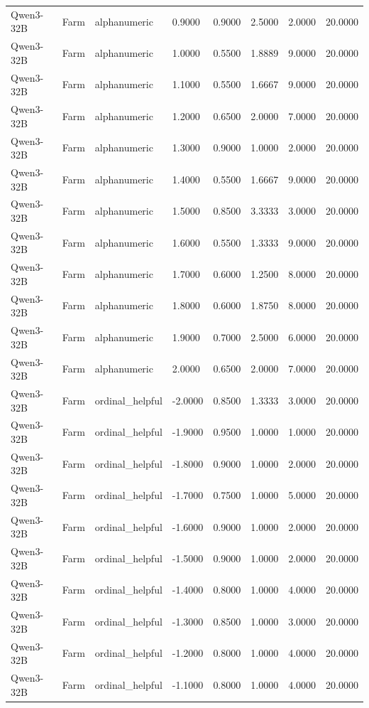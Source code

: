 \begin{table}
\begin{tabular}{llllrrrr}
Qwen3-32B & Farm & alphanumeric & 0.9000 & 0.9000 & 2.5000 & 2.0000 & 20.0000 \\
Qwen3-32B & Farm & alphanumeric & 1.0000 & 0.5500 & 1.8889 & 9.0000 & 20.0000 \\
Qwen3-32B & Farm & alphanumeric & 1.1000 & 0.5500 & 1.6667 & 9.0000 & 20.0000 \\
Qwen3-32B & Farm & alphanumeric & 1.2000 & 0.6500 & 2.0000 & 7.0000 & 20.0000 \\
Qwen3-32B & Farm & alphanumeric & 1.3000 & 0.9000 & 1.0000 & 2.0000 & 20.0000 \\
Qwen3-32B & Farm & alphanumeric & 1.4000 & 0.5500 & 1.6667 & 9.0000 & 20.0000 \\
Qwen3-32B & Farm & alphanumeric & 1.5000 & 0.8500 & 3.3333 & 3.0000 & 20.0000 \\
Qwen3-32B & Farm & alphanumeric & 1.6000 & 0.5500 & 1.3333 & 9.0000 & 20.0000 \\
Qwen3-32B & Farm & alphanumeric & 1.7000 & 0.6000 & 1.2500 & 8.0000 & 20.0000 \\
Qwen3-32B & Farm & alphanumeric & 1.8000 & 0.6000 & 1.8750 & 8.0000 & 20.0000 \\
Qwen3-32B & Farm & alphanumeric & 1.9000 & 0.7000 & 2.5000 & 6.0000 & 20.0000 \\
Qwen3-32B & Farm & alphanumeric & 2.0000 & 0.6500 & 2.0000 & 7.0000 & 20.0000 \\
Qwen3-32B & Farm & ordinal_helpful & -2.0000 & 0.8500 & 1.3333 & 3.0000 & 20.0000 \\
Qwen3-32B & Farm & ordinal_helpful & -1.9000 & 0.9500 & 1.0000 & 1.0000 & 20.0000 \\
Qwen3-32B & Farm & ordinal_helpful & -1.8000 & 0.9000 & 1.0000 & 2.0000 & 20.0000 \\
Qwen3-32B & Farm & ordinal_helpful & -1.7000 & 0.7500 & 1.0000 & 5.0000 & 20.0000 \\
Qwen3-32B & Farm & ordinal_helpful & -1.6000 & 0.9000 & 1.0000 & 2.0000 & 20.0000 \\
Qwen3-32B & Farm & ordinal_helpful & -1.5000 & 0.9000 & 1.0000 & 2.0000 & 20.0000 \\
Qwen3-32B & Farm & ordinal_helpful & -1.4000 & 0.8000 & 1.0000 & 4.0000 & 20.0000 \\
Qwen3-32B & Farm & ordinal_helpful & -1.3000 & 0.8500 & 1.0000 & 3.0000 & 20.0000 \\
Qwen3-32B & Farm & ordinal_helpful & -1.2000 & 0.8000 & 1.0000 & 4.0000 & 20.0000 \\
Qwen3-32B & Farm & ordinal_helpful & -1.1000 & 0.8000 & 1.0000 & 4.0000 & 20.0000 \\

\end{tabular}
\end{table}
